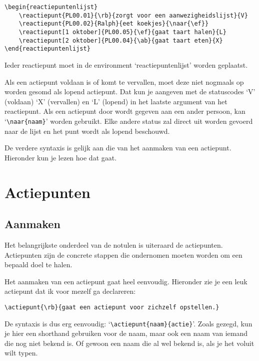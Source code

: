 \documentclass[a4paper]{notulen}
\begin{document}
			\begin{lstlisting}
\begin{reactiepuntenlijst}
	\reactiepunt{PL00.01}{\rb}{zorgt voor een aanwezigheidslijst}{V}
	\reactiepunt{PL00.02}{Ralph}{eet koekjes}{\naar{\ef}}
	\reactiepunt[1 oktober]{PL00.05}{\ef}{gaat taart halen}{L}
	\reactiepunt[2 oktober]{PL00.04}{\ab}{gaat taart eten}{X}
\end{reactiepuntenlijst}
			\end{lstlisting}
			
			Ieder reactiepunt moet in de environment `reactiepuntenlijst' worden geplaatst.
			
			Als een actiepunt voldaan is of komt te vervallen, moet deze niet nogmaals op worden gesomd als lopend actiepunt. Dat kun je aangeven met 
			de statuscodes `V' (voldaan) `X' (vervallen) en `L' (lopend) in het laatste argument van het reactiepunt. Als een actiepunt door wordt gegeven
			aan een ander persoon, kan `\lstinline!\naar{naam}!' worden gebruikt. Elke andere status zal direct uit worden gevoerd naar de lijst en het 
			punt wordt als lopend beschouwd.
			
			De verdere syntaxis is gelijk aan die van het aanmaken van een actiepunt. Hieronder kun je lezen hoe dat gaat.
						
	\section{Actiepunten}
		\subsection{Aanmaken}
			Het belangrijkste onderdeel van de notulen is uiteraard de actiepunten. Actiepunten zijn de concrete stappen die ondernomen moeten
			worden om een bepaald doel te halen.
			
			Het aanmaken van een actiepunt gaat heel eenvoudig. Hieronder zie je een leuk actiepunt dat ik voor mezelf ga declareren:
			
			
			\begin{lstlisting}
\actiepunt{\rb}{gaat een actiepunt voor zichzelf opstellen.}
			\end{lstlisting}
			
			De syntaxis is dus erg eenvoudig: `\lstinline!\actiepunt{naam}{actie}!'. Zoals gezegd, kun je hier een shorthand gebruiken voor de naam,
			maar ook een naam van iemand die nog niet bekend is. Of gewoon een naam die al wel bekend is, als je het voluit wilt typen.
			
\end{document}
